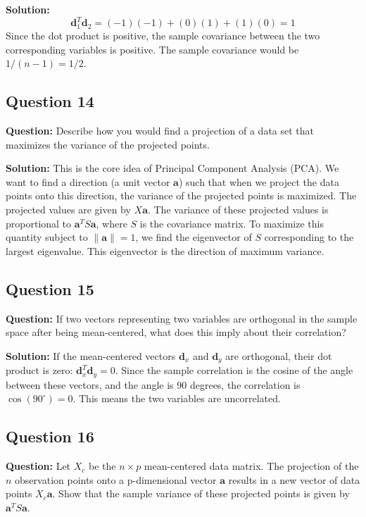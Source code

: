 \textbf{Solution:}
$$ \mathbf{d}_1^T \mathbf{d}_2 = (-1)(-1) + (0)(1) + (1)(0) = 1 $$
Since the dot product is positive, the sample covariance between the two corresponding variables is positive. The sample covariance would be $1 / (n-1) = 1/2$.

\subsection*{Question 14}
\textbf{Question:} Describe how you would find a projection of a data set that maximizes the variance of the projected points.

\textbf{Solution:}
This is the core idea of Principal Component Analysis (PCA). We want to find a direction (a unit vector $\mathbf{a}$) such that when we project the data points onto this direction, the variance of the projected points is maximized. The projected values are given by $X\mathbf{a}$. The variance of these projected values is proportional to $\mathbf{a}^T S \mathbf{a}$, where $S$ is the covariance matrix. To maximize this quantity subject to $\|\mathbf{a}\|=1$, we find the eigenvector of $S$ corresponding to the largest eigenvalue. This eigenvector is the direction of maximum variance.

\subsection*{Question 15}
\textbf{Question:} If two vectors representing two variables are orthogonal in the sample space after being mean-centered, what does this imply about their correlation?

\textbf{Solution:}
If the mean-centered vectors $\mathbf{d}_x$ and $\mathbf{d}_y$ are orthogonal, their dot product is zero: $\mathbf{d}_x^T \mathbf{d}_y = 0$. Since the sample correlation is the cosine of the angle between these vectors, and the angle is 90 degrees, the correlation is $\cos(90^\circ) = 0$. This means the two variables are uncorrelated.

\subsection*{Question 16}
\textbf{Question:} Let $X_c$ be the $n \times p$ mean-centered data matrix. The projection of the $n$ observation points onto a p-dimensional vector $\mathbf{a}$ results in a new vector of data points $X_c \mathbf{a}$. Show that the sample variance of these projected points is given by $\mathbf{a}^T S \mathbf{a}$.

